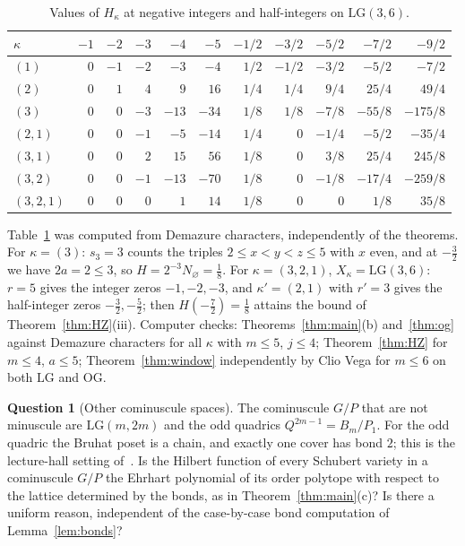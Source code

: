 \documentclass[submission]{FPSAC2027}
\theoremstyle{definition}
\newtheorem{question}[theorem]{Question}
\theoremstyle{remark}
\newcommand{\LG}{\mathrm{LG}}
\newcommand{\OG}{\mathrm{OG}}
\begin{document}
\begin{table}[ht]
\centering
\footnotesize
\renewcommand{\arraystretch}{1.05}
\setlength{\tabcolsep}{4pt}
\begin{tabular}{@{}l|rrrrr|rrrrr@{}}
\toprule
$\kappa$ & $-1$ & $-2$ & $-3$ & $-4$ & $-5$ & $-1/2$ & $-3/2$ & $-5/2$ & $-7/2$ & $-9/2$\\
\midrule
$(1)$ & $0$ & $-1$ & $-2$ & $-3$ & $-4$ & $1/2$ & $-1/2$ & $-3/2$ & $-5/2$ & $-7/2$\\
$(2)$ & $0$ & $1$ & $4$ & $9$ & $16$ & $1/4$ & $1/4$ & $9/4$ & $25/4$ & $49/4$\\
$(3)$ & $0$ & $0$ & $-3$ & $-13$ & $-34$ & $1/8$ & $1/8$ & $-7/8$ & $-55/8$ & $-175/8$\\
$(2,1)$ & $0$ & $0$ & $-1$ & $-5$ & $-14$ & $1/4$ & $0$ & $-1/4$ & $-5/2$ & $-35/4$\\
$(3,1)$ & $0$ & $0$ & $2$ & $15$ & $56$ & $1/8$ & $0$ & $3/8$ & $25/4$ & $245/8$\\
$(3,2)$ & $0$ & $0$ & $-1$ & $-13$ & $-70$ & $1/8$ & $0$ & $-1/8$ & $-17/4$ & $-259/8$\\
$(3,2,1)$ & $0$ & $0$ & $0$ & $1$ & $14$ & $1/8$ & $0$ & $0$ & $1/8$ & $35/8$\\
\bottomrule
\end{tabular}
\caption{Values of $H_\kappa$ at negative integers and half-integers on $\LG(3,6)$.}\label{tab:lg3vals}
\end{table}

Table~\ref{tab:lg3vals} was computed from Demazure characters, independently of the theorems.
For $\kappa=(3)$: $s_3=3$ counts the triples $2\le x<y<z\le5$ with $x$ even, and at $-\tfrac32$ we
have $2a=2\le3$, so $H=2^{-3}N_\varnothing=\tfrac18$. For $\kappa=(3,2,1)$, $X_\kappa=\LG(3,6)$:
$r=5$ gives the integer zeros $-1,-2,-3$, and $\kappa'=(2,1)$ with $r'=3$ gives the half-integer
zeros $-\tfrac32,-\tfrac52$; then $H(-\tfrac72)=\tfrac18$ attains the bound of Theorem~\ref{thm:HZ}(iii). Computer checks:
Theorems~\ref{thm:main}(b) and~\ref{thm:og} against Demazure characters for all $\kappa$ with
$m\le5$, $j\le4$; Theorem~\ref{thm:HZ} for $m\le4$, $a\le5$; Theorem~\ref{thm:window} independently by
Clio Vega for $m\le6$ on both $\LG$ and $\OG$.

\begin{question}[Other cominuscule spaces]\label{q:cominuscule}
The cominuscule $G/P$ that are not minuscule are $\LG(m,2m)$ and the odd quadrics
$Q^{2m-1}=B_m/P_1$. For the odd quadric the Bruhat poset is a chain, and exactly one cover has
bond $2$; this is the lecture-hall setting of~\cite{CCFL}. Is the Hilbert function of every
Schubert variety in a cominuscule $G/P$ the Ehrhart polynomial of its order polytope with
respect to the lattice determined by the bonds, as in Theorem~\ref{thm:main}(c)? Is there a
uniform reason, independent of the case-by-case bond computation of Lemma~\ref{lem:bonds}?
\end{question}
\end{document}
